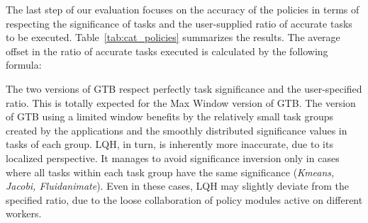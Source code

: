 \begin{table}[tb]
\caption{Degree of accuracy of the proposed policies.}\label{tab:cat_policies}
\end{table}

The last step of our evaluation focuses on the accuracy of the policies in terms of respecting the significance of tasks and the user-supplied ratio of accurate tasks to be executed. Table~\ref{tab:cat_policies} summarizes the results. The average offset in the ratio of accurate tasks executed is calculated by the following formula:\\
\begin{center}

\end{center}

The two versions of GTB respect perfectly task significance and the user-specified ratio. This is totally expected for the Max Window version of GTB. The version of GTB using a limited window benefits by the relatively small task groups created by the applications and the smoothly distributed significance values in tasks of each group. LQH, in turn, is inherently more inaccurate, due to its localized perspective. It manages to avoid significance inversion only in cases where all tasks within each task group have the same significance ({\it Kmeans, Jacobi, Fluidanimate}). Even in these cases, LQH may slightly deviate from the specified ratio, due to the loose collaboration of policy modules active on different workers. 
